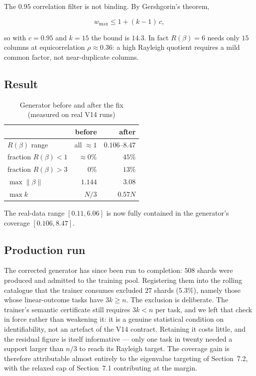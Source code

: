 \documentclass[11pt]{article}
\newcommand{\Rq}{R(\beta)}
\begin{document}
The $0.95$ correlation filter is not binding. By Gershgorin's theorem,

\begin{equation}
w_{\max} \le 1 + (k-1)\,c ,
\end{equation}

so with $c = 0.95$ and $k = 15$ the bound is $14.3$. In fact $\Rq = 6$ needs
only $15$ columns at equicorrelation $\rho \approx 0.36$: a high Rayleigh
quotient requires a mild common factor, not near-duplicate columns.

\subsection{Result}

\begin{table}[h]
\centering
\caption{Generator before and after the fix (measured on real V14 runs)}
\begin{tabular}{@{}lrr@{}}
\toprule
 & before & after \\
\midrule
$\Rq$ range        & all $\approx 1$ & $0.106$--$8.47$ \\
fraction $\Rq < 1$ & $\approx 0\%$ & $45\%$ \\
fraction $\Rq > 3$ & $0\%$ & $13\%$ \\
$\max \|\beta\|$   & $1.144$ & $3.08$ \\
$\max k$           & $N/3$ & $0.57N$ \\
\bottomrule
\end{tabular}
\end{table}

The real-data range $[0.11, 6.06]$ is now fully contained in the
generator's coverage $[0.106, 8.47]$.

\subsection{Production run}
\label{sec:v15prod}

The corrected generator has since been run to completion: $508$ shards were
produced and admitted to the training pool. Registering them into the rolling
catalogue that the trainer consumes excluded $27$ shards ($5.3\%$), namely
those whose linear-outcome tasks have $3k \ge n$. The exclusion is deliberate.
The trainer's semantic certificate still requires $3k < n$ per task, and we
left that check in force rather than weakening it: it is a genuine statistical
condition on identifiability, not an artefact of the V14 contract. Retaining
it costs little, and the residual figure is itself informative --- only one
task in twenty needed a support larger than $n/3$ to reach its Rayleigh
target. The coverage gain is therefore attributable almost entirely to the
eigenvalue targeting of Section~7.2, with the relaxed cap of Section~7.1
contributing at the margin.
\end{document}
